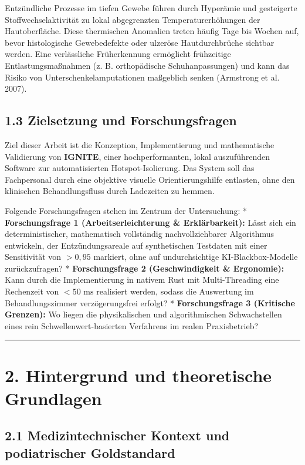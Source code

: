 \documentclass[
  11pt,
]{article}
\begin{document}
Entzündliche Prozesse im tiefen Gewebe führen durch Hyperämie und
gesteigerte Stoffwechselaktivität zu lokal abgegrenzten
Temperaturerhöhungen der Hautoberfläche. Diese thermischen Anomalien
treten häufig Tage bis Wochen auf, bevor histologische Gewebedefekte
oder ulzeröse Hautdurchbrüche sichtbar werden. Eine verlässliche
Früherkennung ermöglicht frühzeitige Entlastungsmaßnahmen (z. B.
orthopädische Schuhanpassungen) und kann das Risiko von
Unterschenkelamputationen maßgeblich senken (Armstrong et al. 2007).

\subsection{1.3 Zielsetzung und
Forschungsfragen}\label{zielsetzung-und-forschungsfragen}

Ziel dieser Arbeit ist die Konzeption, Implementierung und mathematische
Validierung von \textbf{IGNITE}, einer hochperformanten, lokal
auszuführenden Software zur automatisierten Hotspot-Isolierung. Das
System soll das Fachpersonal durch eine objektive visuelle
Orientierungshilfe entlasten, ohne den klinischen Behandlungsfluss durch
Ladezeiten zu hemmen.

Folgende Forschungsfragen stehen im Zentrum der Untersuchung: *
\textbf{Forschungsfrage 1 (Arbeitserleichterung \& Erklärbarkeit):}
Lässt sich ein deterministischer, mathematisch vollständig
nachvollziehbarer Algorithmus entwickeln, der Entzündungsareale auf
synthetischen Testdaten mit einer Sensitivität von \(> 0{,}95\)
markiert, ohne auf undurchsichtige KI-Blackbox-Modelle zurückzufragen? *
\textbf{Forschungsfrage 2 (Geschwindigkeit \& Ergonomie):} Kann durch
die Implementierung in nativem Rust mit Multi-Threading eine Rechenzeit
von \(< 50\text{ ms}\) realisiert werden, sodass die Auswertung im
Behandlungszimmer verzögerungsfrei erfolgt? * \textbf{Forschungsfrage 3
(Kritische Grenzen):} Wo liegen die physikalischen und algorithmischen
Schwachstellen eines rein Schwellenwert-basierten Verfahrens im realen
Praxisbetrieb?

\begin{center}\rule{0.5\linewidth}{0.5pt}\end{center}

\section{2. Hintergrund und theoretische
Grundlagen}\label{hintergrund-und-theoretische-grundlagen}

\subsection{2.1 Medizintechnischer Kontext und podiatrischer
Goldstandard}\label{medizintechnischer-kontext-und-podiatrischer-goldstandard}
\end{document}
